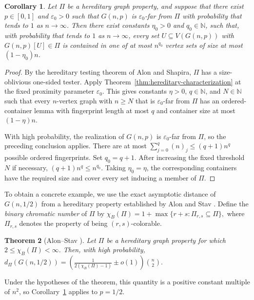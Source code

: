 \documentclass[11pt,reqno,letterpaper]{amsart}
\newcommand{\N}{{\mathbb N}}
\theoremstyle{plain}
\newtheorem{thm}{Theorem}[section]
\newtheorem{cor}[thm]{Corollary}
\theoremstyle{remark}
\begin{document}
\begin{cor}\label{cor:random-hereditary}
Let $\Pi$ be a hereditary graph property, and suppose that there exist $p\in[0,1]$ and $\varepsilon_0>0$ such that $G(n,p)$ is $\varepsilon_0$-far from $\Pi$  with probability that tends to $1$ as $n\rightarrow\infty$. Then there exist constants $\eta_0>0$ and  $q_0\in\N$, such that, with probability that tends to $1$ as $n\rightarrow\infty$, every set $U\subseteq V(G(n,p))$ with $G(n,p)[U]\in\Pi$ is contained in one of at most $n^{q_0}$ vertex sets of size at most $(1-\eta_0)n$.
\end{cor}
\begin{proof}
By the hereditary testing theorem of Alon and Shapira, $\Pi$ has a
size-oblivious one-sided tester.  Apply
Theorem~\ref{thm:hereditary-characterization} at the fixed proximity parameter
$\varepsilon_0$.  This gives constants $\eta>0$, $q\in\N$, and $N\in\N$ such
that every $n$-vertex graph with $n\geq N$ that is $\varepsilon_0$-far from $\Pi$ has
an ordered-container lemma with fingerprint length at most $q$ and container
size at most $(1-\eta)n$.

With high probability, the realization of $G(n,p)$ is
$\varepsilon_0$-far from $\Pi$, so the preceding conclusion applies.  There
are at most $\sum_{j=0}^{q}(n)_j\leq(q+1)n^q$ possible ordered fingerprints.
Set $q_0=q+1$.  After increasing the fixed threshold $N$ if necessary,
$(q+1)n^q\leq n^{q_0}$.  Taking $\eta_0=\eta$, the corresponding containers
have the required size and cover every set inducing a member of $\Pi$.
\end{proof}

To obtain a concrete example, we use the exact asymptotic distance of
$G(n,1/2)$ from a hereditary property established by Alon and Stav
\cite{alon2008maximum}.  Define the \textit{binary chromatic number} of $\Pi$
by
\(\chi_B(\Pi) = 1+\max\{r+s:\Pi_{r,s}\subseteq \Pi\},\)
where $\Pi_{r,s}$ denotes the property of being $(r,s)$-colorable. 

\begin{thm}[Alon--Stav \cite{alon2008maximum}]\label{thm:alon-stav-half}
Let $\Pi$ be a hereditary graph property for which
$2\leq\chi_B(\Pi)<\infty$.  Then, with high probability,
\(d_\Pi(G(n,1/2)) = \left( \frac{1}{2(\chi_B(\Pi)-1)}\pm o(1) \right)\binom{n}{2}.\)
\end{thm}

Under the hypotheses of the theorem, this quantity is a positive constant multiple of
$n^2$, so Corollary~\ref{cor:random-hereditary} applies to $p=1/2$.
\end{document}
